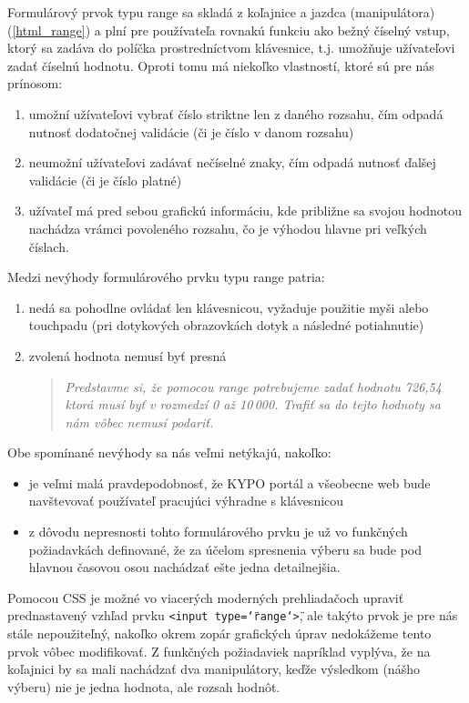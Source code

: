 \documentclass[
  digital, %
  twoside, %
  notable,   %
  nolof,   %
  nolot,   %
]{fithesis3}
\begin{document}
Formulárový prvok typu range sa skladá z koľajnice a jazdca (manipulátora) (\ref{html_range}) a plní pre používateľa rovnakú funkciu ako bežný číselný vstup, ktorý sa zadáva do políčka prostredníctvom klávesnice, t.j. umožňuje užívateľovi zadať číselnú hodnotu. Oproti tomu má niekoľko vlastností, ktoré sú pre nás prínosom:
\begin{enumerate}
\item umožní užívateľovi vybrať číslo striktne len z daného rozsahu, čím odpadá nutnosť dodatočnej validácie (či je číslo v danom rozsahu)
\item neumožní užívateľovi zadávať nečíselné znaky, čím odpadá nutnosť ďalšej validácie (či je číslo platné)
\item užívateľ má pred sebou grafickú informáciu, kde približne sa svojou hodnotou nachádza vrámci povoleného rozsahu, čo je výhodou hlavne pri veľkých číslach.
\end{enumerate}

Medzi nevýhody formulárového prvku typu range patria:
\begin{enumerate}
\item nedá sa pohodlne ovládať len klávesnicou, vyžaduje použitie myši alebo touchpadu (pri dotykových obrazovkách dotyk a následné potiahnutie)
\item zvolená hodnota nemusí byť presná
\begin{quote}
\textit{Predstavme si, že pomocou range potrebujeme zadať hodnotu 726,54 ktorá musí byť v rozmedzí 0 až 10\,000. Trafiť sa do tejto hodnoty sa nám vôbec nemusí podariť.}
\end{quote}
\end{enumerate}

Obe spomínané nevýhody sa nás veľmi netýkajú, nakoľko:
\begin{itemize}
\item je veľmi malá pravdepodobnosť, že KYPO portál a všeobecne web bude navštevovať používateľ pracujúci výhradne s klávesnicou
\item z dôvodu nepresnosti tohto formulárového prvku je už vo funkčných požiadavkách definované, že za účelom spresnenia výberu sa bude pod hlavnou časovou osou nachádzať ešte jedna detailnejšia.
\end{itemize}

Pomocou CSS je možné vo viacerých moderných prehliadačoch upraviť prednastavený vzhľad prvku \texttt{<input type=\char`\"range\char`\">}, ale takýto prvok je pre nás stále nepoužiteľný, nakoľko okrem zopár grafických úprav nedokážeme tento prvok vôbec modifikovať. Z funkčných požiadaviek napríklad vyplýva, že na koľajnici by sa mali nachádzať dva manipulátory, keďže výsledkom (nášho výberu) nie je jedna hodnota, ale rozsah hodnôt.
\end{document}

